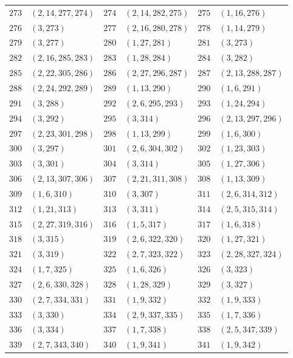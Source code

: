 {\begin{longtable}{@{}rl@{\qquad}rl@{\qquad}rl@{}}
\(273\)&\((2,14,277,274)\) & \(274\)&\((2,14,282,275)\) & \(275\)&\((1,16,276)\)\\
\(276\)&\((3,273)\) & \(277\)&\((2,16,280,278)\) & \(278\)&\((1,14,279)\)\\
\(279\)&\((3,277)\) & \(280\)&\((1,27,281)\) & \(281\)&\((3,273)\)\\
\(282\)&\((2,16,285,283)\) & \(283\)&\((1,28,284)\) & \(284\)&\((3,282)\)\\
\(285\)&\((2,22,305,286)\) & \(286\)&\((2,27,296,287)\) & \(287\)&\((2,13,288,287)\)\\
\(288\)&\((2,24,292,289)\) & \(289\)&\((1,13,290)\) & \(290\)&\((1,6,291)\)\\
\(291\)&\((3,288)\) & \(292\)&\((2,6,295,293)\) & \(293\)&\((1,24,294)\)\\
\(294\)&\((3,292)\) & \(295\)&\((3,314)\) & \(296\)&\((2,13,297,296)\)\\
\(297\)&\((2,23,301,298)\) & \(298\)&\((1,13,299)\) & \(299\)&\((1,6,300)\)\\
\(300\)&\((3,297)\) & \(301\)&\((2,6,304,302)\) & \(302\)&\((1,23,303)\)\\
\(303\)&\((3,301)\) & \(304\)&\((3,314)\) & \(305\)&\((1,27,306)\)\\
\(306\)&\((2,13,307,306)\) & \(307\)&\((2,21,311,308)\) & \(308\)&\((1,13,309)\)\\
\(309\)&\((1,6,310)\) & \(310\)&\((3,307)\) & \(311\)&\((2,6,314,312)\)\\
\(312\)&\((1,21,313)\) & \(313\)&\((3,311)\) & \(314\)&\((2,5,315,314)\)\\
\(315\)&\((2,27,319,316)\) & \(316\)&\((1,5,317)\) & \(317\)&\((1,6,318)\)\\
\(318\)&\((3,315)\) & \(319\)&\((2,6,322,320)\) & \(320\)&\((1,27,321)\)\\
\(321\)&\((3,319)\) & \(322\)&\((2,7,323,322)\) & \(323\)&\((2,28,327,324)\)\\
\(324\)&\((1,7,325)\) & \(325\)&\((1,6,326)\) & \(326\)&\((3,323)\)\\
\(327\)&\((2,6,330,328)\) & \(328\)&\((1,28,329)\) & \(329\)&\((3,327)\)\\
\(330\)&\((2,7,334,331)\) & \(331\)&\((1,9,332)\) & \(332\)&\((1,9,333)\)\\
\(333\)&\((3,330)\) & \(334\)&\((2,9,337,335)\) & \(335\)&\((1,7,336)\)\\
\(336\)&\((3,334)\) & \(337\)&\((1,7,338)\) & \(338\)&\((2,5,347,339)\)\\
\(339\)&\((2,7,343,340)\) & \(340\)&\((1,9,341)\) & \(341\)&\((1,9,342)\)\\

\end{longtable}}
